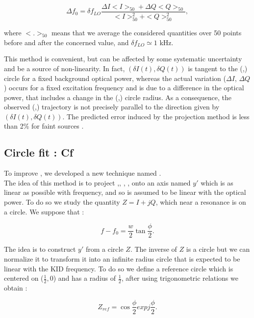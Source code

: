 \begin{equation}
\label{eq:Rf}
\Delta f_{0} = \delta f_{LO} \frac{\Delta I < I >_{50} + \Delta Q < Q >_{50}}{< I >_{50}^{2} + < Q >_{50}^{2}},
\end{equation}


where $<.>_{50}$ means that we average the considered quantities over 50 points before and after the concerned value, and $\delta f_{LO} \simeq 1$ kHz.

This method is convenient, but can be affected by some systematic uncertainty and be a source of non-linearity. In fact, $(\delta I(t), \delta Q(t))$ is tangent to the (\I,\Q) circle for a fixed background optical power, whereas the actual variation ($\Delta I$, $\Delta Q$) occurs for a fixed excitation frequency and is due to a difference in the optical power, that includes a change in the (\I,\Q) circle radius. As a consequence, the observed (\I,\Q) trajectory is not precisely parallel to the direction given by $(\delta I(t), \delta Q(t))$. The predicted error induced by the projection method is less than 2\% for faint sources \citep{2013A&A...551L..12C}.

\subsection{Circle fit : Cf}
To improve \rf, we developed a new technique named \cf.\\
The idea of this method is to project \I,\Q, \di, \dq, onto an axis named $y'$ which is as linear as possible with frequency, and so is assumed to be linear with the optical power. To do so we study the quantity $Z=I+jQ$, which near a resonance is on a circle. We suppose that :

\begin{equation}
f - f_{0}= \frac{w}{2} \tan \frac{\phi}{2}.
\label{eq:hyp-f}
\end{equation}

The idea is to construct $y'$ from a circle $Z$. The inverse of $Z$ is a circle but we can normalize it to transform it into an infinite radius circle that is expected to be linear with the KID frequency.  To do so we define a reference circle which is centered on ($\frac{1}{2},0$) and has a radius of $\frac{1}{2}$, after using trigonometric relations we obtain : 

\begin{equation}
Z_{ref} = \cos \frac{\phi}{2} exp j \frac{\phi}{2}.
\label{eq:Zref}
\end{equation}

